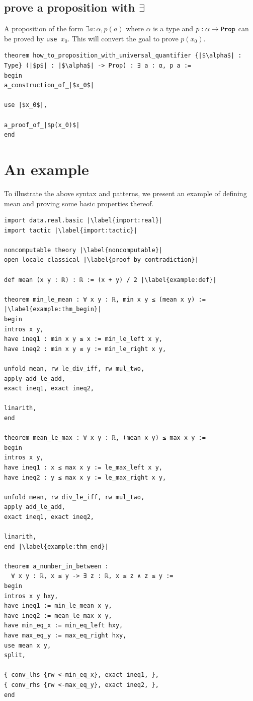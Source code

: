 \documentclass{report}
\theoremstyle{definition}
\begin{document}
\subsection{prove a proposition with $\exists$}\label{lean:exists}
A proposition of the form $\exists a:\alpha, p(a)$ where $\alpha$ is a type and $p : \alpha\to {\tt \small Prop}$ can be proved by {\tt \small use $x_0$}. This will convert the goal to prove $p(x_0)$.

\begin{verbatim}
theorem how_to_proposition_with_universal_quantifier {|$\alpha$| : Type} (|$p$| : |$\alpha$| -> Prop) : ∃ a : α, p a :=
begin
a_construction_of_|$x_0$|

use |$x_0$|,
  
a_proof_of_|$p(x_0)$|
end
\end{verbatim}

\section{An example}
To illustrate the above syntax and patterns, we present an example of defining mean and proving some basic properties thereof.

\begin{verbatim}
import data.real.basic |\label{import:real}|
import tactic |\label{import:tactic}|
  
noncomputable theory |\label{noncomputable}|
open_locale classical |\label{proof_by_contradiction}|  

def mean (x y : ℝ) : ℝ := (x + y) / 2 |\label{example:def}|
  
theorem min_le_mean : ∀ x y : ℝ, min x y ≤ (mean x y) := |\label{example:thm_begin}|
begin
intros x y,
have ineq1 : min x y ≤ x := min_le_left x y,
have ineq2 : min x y ≤ y := min_le_right x y,
    
unfold mean, rw le_div_iff, rw mul_two, 
apply add_le_add, 
exact ineq1, exact ineq2, 
  
linarith,
end
  
theorem mean_le_max : ∀ x y : ℝ, (mean x y) ≤ max x y :=
begin
intros x y,
have ineq1 : x ≤ max x y := le_max_left x y,
have ineq2 : y ≤ max x y := le_max_right x y,
  
unfold mean, rw div_le_iff, rw mul_two,
apply add_le_add,
exact ineq1, exact ineq2,
  
linarith,
end |\label{example:thm_end}|
  
theorem a_number_in_between : 
  ∀ x y : ℝ, x ≤ y -> ∃ z : ℝ, x ≤ z ∧ z ≤ y :=
begin
intros x y hxy,
have ineq1 := min_le_mean x y,
have ineq2 := mean_le_max x y,
have min_eq_x := min_eq_left hxy,
have max_eq_y := max_eq_right hxy,
use mean x y,
split,
  
{ conv_lhs {rw <-min_eq_x}, exact ineq1, },
{ conv_rhs {rw <-max_eq_y}, exact ineq2, },
end

\end{verbatim}
\end{document}
